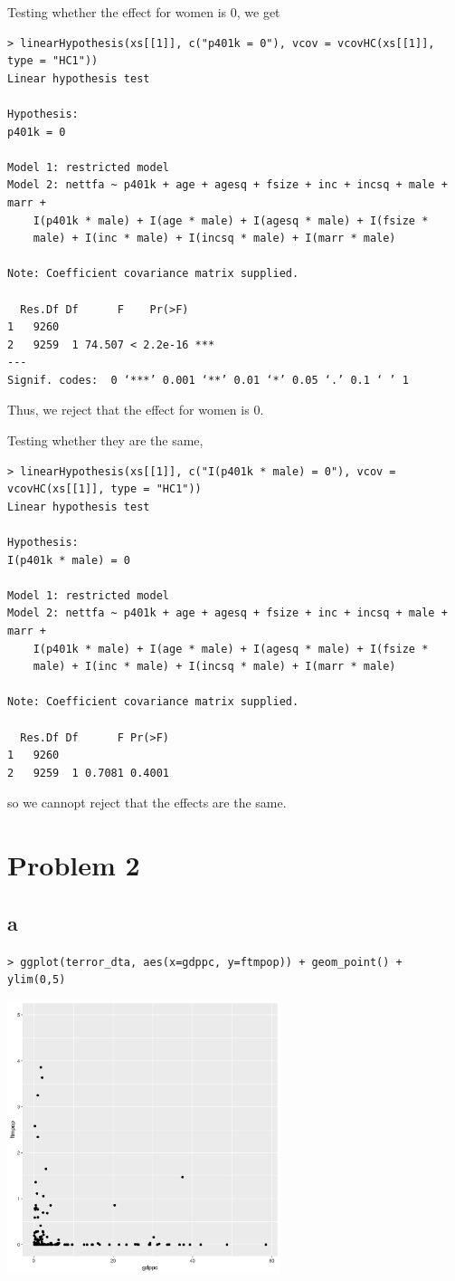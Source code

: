 \documentclass[12pt,letterpaper]{article}
\theoremstyle{definition}
\begin{document}
Testing whether the effect for women is $0$, we get
\begin{Verbatim}[fontsize=\small]
> linearHypothesis(xs[[1]], c("p401k = 0"), vcov = vcovHC(xs[[1]], type = "HC1"))
Linear hypothesis test

Hypothesis:
p401k = 0

Model 1: restricted model
Model 2: nettfa ~ p401k + age + agesq + fsize + inc + incsq + male + marr +
    I(p401k * male) + I(age * male) + I(agesq * male) + I(fsize *
    male) + I(inc * male) + I(incsq * male) + I(marr * male)

Note: Coefficient covariance matrix supplied.

  Res.Df Df      F    Pr(>F)
1   9260
2   9259  1 74.507 < 2.2e-16 ***
---
Signif. codes:  0 ‘***’ 0.001 ‘**’ 0.01 ‘*’ 0.05 ‘.’ 0.1 ‘ ’ 1
\end{Verbatim}
Thus, we reject that the effect for women is 0.

Testing whether they are the same,
\begin{Verbatim}[fontsize=\small]
> linearHypothesis(xs[[1]], c("I(p401k * male) = 0"), vcov = vcovHC(xs[[1]], type = "HC1"))
Linear hypothesis test

Hypothesis:
I(p401k * male) = 0

Model 1: restricted model
Model 2: nettfa ~ p401k + age + agesq + fsize + inc + incsq + male + marr +
    I(p401k * male) + I(age * male) + I(agesq * male) + I(fsize *
    male) + I(inc * male) + I(incsq * male) + I(marr * male)

Note: Coefficient covariance matrix supplied.

  Res.Df Df      F Pr(>F)
1   9260
2   9259  1 0.7081 0.4001
\end{Verbatim}
so we cannopt reject that the effects are the same.

\section*{Problem 2}

\subsection*{a}

\verb|> ggplot(terror_dta, aes(x=gdppc, y=ftmpop)) + geom_point() + ylim(0,5)|
\begin{center}
  \includegraphics[width=0.6\textwidth]{figures/2a.png}
\end{center}
\end{document}
